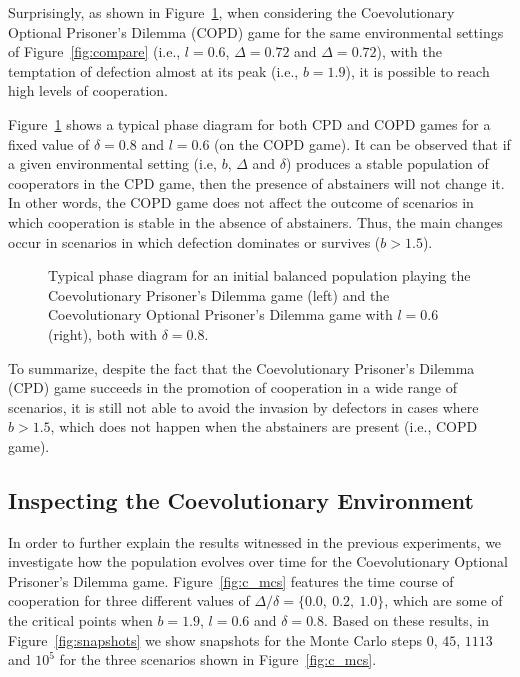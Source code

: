 \documentclass{llncs}
\begin{document}
Surprisingly, as shown in Figure~\ref{fig:phase}, when considering the
Coevolutionary Optional Prisoner's Dilemma (COPD) game for the same
environmental settings of Figure~\ref{fig:compare} (i.e., $l=0.6$,
$\Delta=0.72$ and $\Delta=0.72$), with the temptation of defection almost at
its peak (i.e., $b=1.9$), it is possible to reach high levels of cooperation.

Figure~\ref{fig:phase} shows a typical phase diagram for both CPD and COPD
games for a fixed value of $\delta=0.8$ and $l=0.6$ (on the COPD game). It can be
observed that if a given environmental setting (i.e, $b$, $\Delta$ and
$\delta$) produces a stable population of cooperators in the CPD game, then the
presence of abstainers will not change it. In other words, the COPD game does
not affect the outcome of scenarios in which cooperation is stable in the
absence of abstainers. Thus, the main changes occur in scenarios in which
defection dominates or survives ($b>1.5$).

\begin{figure}[htb]
    \centering
    {}
    {}
    \caption{
        Typical phase diagram for an initial balanced population playing the
        Coevolutionary Prisoner's Dilemma game (left) and the Coevolutionary
        Optional Prisoner's Dilemma game with $l=0.6$ (right), both with $\delta=0.8$.
    }
    \label{fig:phase}
\end{figure}

To summarize, despite the fact that the Coevolutionary Prisoner's Dilemma (CPD)
game succeeds in the promotion of cooperation in a wide range of scenarios,
it is still not able to avoid the invasion by defectors in cases where $b>1.5$, which
does not happen when the abstainers are present (i.e., COPD game).


\subsection{Inspecting the Coevolutionary Environment}

In order to further explain the results witnessed in the previous experiments,
we investigate how the population evolves over time for the Coevolutionary
Optional Prisoner's Dilemma game.  Figure~\ref{fig:c_mcs} features the time
course of cooperation for three different values of $\Delta/\delta=\{0.0,\
0.2,\ 1.0\}$, which are some of the critical points when $b=1.9$, $l=0.6$ and
$\delta=0.8$. Based on these results, in Figure~\ref{fig:snapshots} we show
snapshots for the Monte Carlo steps $0$, $45$, $1113$ and $10^5$ for the three
scenarios shown in Figure~\ref{fig:c_mcs}.
\end{document}
